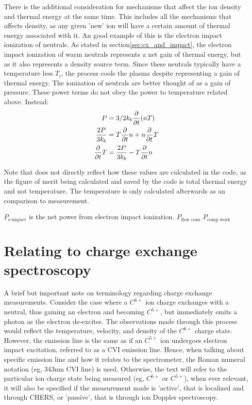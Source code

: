 \begin{refsection}
There is the additional consideration for mechanisms that affect the ion density and thermal energy at the same time. This includes all the mechanisms that affects density, as any given 'new' ion will have a certain amount of thermal energy associated with it. An good example of this is the electron impact ionization of neutrals. As stated in section\ref{sec:cx_and_impact}, the electron impact ionization of warm neutrals represents a net gain of thermal energy, but as it also represents a density source term. Since these neutrals typically have a temperature less $T_i$, the process cools the plasma despite representing a gain of thermal energy. The ionization of neutrals are better thought of as a gain of pressure. These power terms do not obey the power to temperature related above. Instead:
\begin{align}
    P &= 3/2k_b \frac{\partial}{\partial t}(n T) \\
    \frac{2P}{3k_b} &= T\frac{\partial}{\partial t} n + n \frac{\partial}{\partial t} T \\
    \frac{\partial}{\partial t} T &= \frac{2P}{3k_b} - T\frac{\partial}{\partial t} n 
\end{align}

Note that does not directly reflect how these values are calculated in the code, as the figure of merit being calculated and saved by the code is total thermal energy and not temperature. The temperature is only calculated afterwards as an comparison to measurement. 


$P_{\text{e-impact}}$ is the net power from electron impact ionization.
$P_{\text{flow cons}}$
$P_{\text{comp work}}$


\section{Relating to charge exchange spectroscopy}

A brief but important note on terminology regarding charge exchange measurements. Consider the case where a $C^{6+}$ ion charge exchanges with a neutral, thus gaining an electron and becoming $C^{5+}$, but immediately emits a photon as the electron de-excites. The observations made through this process would reflect the temperature, velocity, and density of the $C^{6+}$ charge state. However, the emission line is the same as if an $C^{5+}$ ion undergoes electron impact excitation, referred to as a CVI emission line. Hence, when talking about specific emission line and how it relates to the spectrometer, the Roman numeral notation (eg, 343nm CVI line) is used. Otherwise, the text will refer to the particular ion charge state being measured (eg, $C^{6+}$ or $C^{5+}$), when ever relevant, it will also be specified if the measurement made is 'active', that is localized and through CHERS, or 'passive', that is through ion Doppler spectroscopy. 


\end{refsection}
